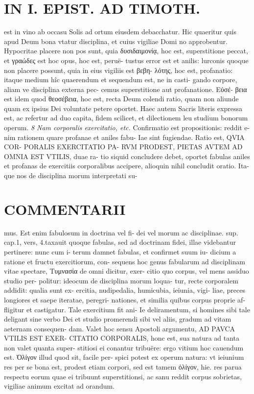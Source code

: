 \documentclass{article}
\begin{document}
\begin{pages}
\section*{IN I. EPIST. AD TIMOTH. }
\marginpar{[ p.97 ]}\pstart est in vino ab occasu Solis ad ortum eiusdem debacchatur. Hic quaeritur quis apud Deum bona vtatur disciplina, et cuius vigiliae Domi no approbentur. Hypocritae placere non pos sunt, quia δυσιδαιμονίᾳ, hoc est, superstitione peccat, et γραώδες est hoc opus, hoc est, peruë- tustus error est et anilis: lurconis quoque non placere possunt, quia in eius vigiliis est βεβη- λότης, hoc est, profanatio: itaque medium hîc quaerendum et sequendum est, ne in casti- gando corpore, aliam ve disciplina externa pec- cemus superstitione aut profanatione. Εὐσέ- βεια est idem quod θεοσέβεια, hoc est, recta Deum colendi ratio, quam non aliunde quam ex ipsius Dei voluntate petere oportet. Haec autem Sacris literis expressa est, ac refertur ad duo capita, fidem scilicet, et dilectionem leu studium bonorum operum.  \pend
\textit{8 Nam corporalis exercitatio, etc. }\pstart Confirmatio est propositionis: reddit e- nim rationem quare profanae et aniles fabu- Iae sint fugiendae. Ratio est, QVIA COR- PORALIS EXERCITATIO PA- RVM PRODEST, PIETAS AVTEM AD OMNIA EST VTILIS, duae ra- tio siquid concludere debet, oportet fabulas aniles et profanas de exercitiis corporalibus accipere, alioquin nihil concludit oratio. Ita- que nos de disciplina morum interpretati su-  \pend
\marginpar{[ p.G ]}
\marginpar{[ p.98 ]}
\section*{COMMENTARII }\pstart mus. Est enim fabulosum in doctrina vel fi- dei vel morum ac disciplinae. sup. cap.1, vers, 4.taxauit quoque fabulas, sed ad doctrinam fidei, illae videbantur pertinere: nunc cum i- terum damnet fabulas, et confirmet suum iu- dicium a ratione et fructu exercitiorum, con- sequens hoc genus fabularum ad disciplinam vitae spectare, Τυμνασία de omni dicitur, exer- citio quo corpus, vel mens assiduo studio per- politur: ideocum de disciplina morum loqua- tur, recte corporalem addidit: qualia sunt ex- ercitia, nudipedalia, humicubia, ieiunia, vigi- liae, preces longiores et saepe iteratae, peregri- nationes, et similia quibus corpus proprie af- fligitur et castigatur. Tale exercitium fit ani- Ie deliramentum, si homines sibi tale deligant sine verbo Dei et studio promerendi sibi vel aliis, gradum ad vitam aeternam consequen- dam. Valet hoc sensu Apostoli argumentu, AD PAVCA VTILIS EST EXER- CITATIO CORPORALIS, honc est, sua natura ad tanta non valet quanta super- stitiosi ei conantur tribuëre: ergo vitium hoc cauendum est. Ὀλίγον illud quod sit, facile per- spici potest ex operum natura: vt ieiunium res per se bona est, prodest etiam corpori, sed est tamem ὀλίγον, hie. res parua respectu eorum quae ei tribuunt superstitionsi, ac sanu reddit corpus sobrietas, vigiliae animum excitat ad orandum.  \pend

\end{pages}
\end{document}
